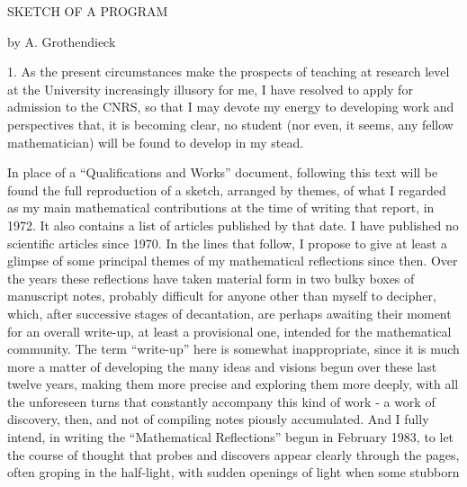 
SKETCH OF A PROGRAM

by A. Grothendieck

1. As the present circumstances make the prospects of teaching at research level
at the University increasingly illusory for me, I have resolved to apply for
admission to the CNRS,
so that I may devote my energy to developing work and perspectives
that, it is becoming clear, no student (nor even, it seems,
any fellow mathematician) will be found to develop in my
stead.

In place of a ``Qualifications and Works'' document,
following this text will be found the full reproduction of a sketch, arranged by themes,
of what I regarded as my main mathematical contributions at the time
of writing that report, in 1972. It also contains
a list of articles published by that date. I have published no scientific
articles since 1970. In the lines that follow,
I propose to give at least a glimpse of some principal themes
of my mathematical reflections since then. Over the years these reflections
have taken material form in two bulky boxes of
manuscript notes, probably difficult for anyone other than
myself to decipher, which, after successive stages of decantation,
are perhaps awaiting their moment for an overall write-up, at least
a provisional one, intended for the mathematical community. The
term ``write-up'' here is somewhat inappropriate,
since it is much more a matter of developing the many ideas and visions begun
over these last twelve years, making them more precise and exploring them
more deeply, with all the unforeseen turns that constantly
accompany this kind of work - a work of discovery, then, and
not of compiling notes piously accumulated. And I fully intend,
in writing the ``Mathematical Reflections'' begun in February
1983,
to let the course of thought that probes and discovers appear
clearly through the pages, often groping in the half-light,
with sudden openings of light when some stubborn


